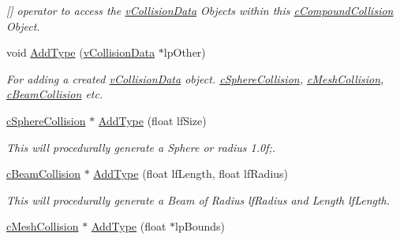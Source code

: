 \begin{DoxyCompactItemize}
\begin{DoxyCompactList}\small\item\em \mbox{[}\mbox{]} operator to access the \hyperlink{classv_collision_data}{vCollisionData} Objects within this \hyperlink{classc_compound_collision}{cCompoundCollision} Object. \end{DoxyCompactList}\item 
\hypertarget{classc_compound_collision_a0561694de30328b4aa20058ab36896a8}{
void \hyperlink{classc_compound_collision_a0561694de30328b4aa20058ab36896a8}{AddType} (\hyperlink{classv_collision_data}{vCollisionData} $\ast$lpOther)}
\label{classc_compound_collision_a0561694de30328b4aa20058ab36896a8}

\begin{DoxyCompactList}\small\item\em For adding a created \hyperlink{classv_collision_data}{vCollisionData} object. \hyperlink{classc_sphere_collision}{cSphereCollision}, \hyperlink{classc_mesh_collision}{cMeshCollision}, \hyperlink{classc_beam_collision}{cBeamCollision} etc. \end{DoxyCompactList}\item 
\hypertarget{classc_compound_collision_a83f2917503be59a302ffe5ac7ea5b83d}{
\hyperlink{classc_sphere_collision}{cSphereCollision} $\ast$ \hyperlink{classc_compound_collision_a83f2917503be59a302ffe5ac7ea5b83d}{AddType} (float lfSize)}
\label{classc_compound_collision_a83f2917503be59a302ffe5ac7ea5b83d}

\begin{DoxyCompactList}\small\item\em This will procedurally generate a Sphere or radius 1.0f;. \end{DoxyCompactList}\item 
\hypertarget{classc_compound_collision_ac3ab2e52fd2ea45debe26100e29183e4}{
\hyperlink{classc_beam_collision}{cBeamCollision} $\ast$ \hyperlink{classc_compound_collision_ac3ab2e52fd2ea45debe26100e29183e4}{AddType} (float lfLength, float lfRadius)}
\label{classc_compound_collision_ac3ab2e52fd2ea45debe26100e29183e4}

\begin{DoxyCompactList}\small\item\em This will procedurally generate a Beam of Radius lfRadius and Length lfLength. \end{DoxyCompactList}\item 
\hypertarget{classc_compound_collision_ab30aa4fa5730514f1c046676523b9f19}{
\hyperlink{classc_mesh_collision}{cMeshCollision} $\ast$ \hyperlink{classc_compound_collision_ab30aa4fa5730514f1c046676523b9f19}{AddType} (float $\ast$lpBounds)}
\label{classc_compound_collision_ab30aa4fa5730514f1c046676523b9f19}


\end{DoxyCompactItemize}
